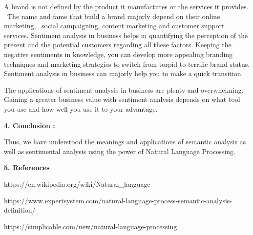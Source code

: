 \documentclass{article} %
\begin{document}
\noindent          A brand is not defined by the product it manufactures or the services it provides. ~The name and fame that build a brand majorly depend on their online marketing, ~social campaigning, content marketing and customer support services. Sentiment analysis in business helps in quantifying the perception of the present and the potential customers regarding all these factors. Keeping the negative sentiments in knowledge, you can develop more appealing branding techniques and marketing strategies to switch from torpid to terrific brand status. Sentiment analysis in business can majorly help you to make a quick transition.

\noindent           The applications of sentiment analysis in business are plenty and overwhelming. Gaining a greater business value with sentiment analysis depends on what tool you use and how well you use it to your advantage.

\noindent \textbf{}

\noindent \textbf{}

\noindent \textbf{}

\noindent \textbf{}

\noindent \textbf{}

\noindent \textbf{}

\noindent \textbf{}

\noindent \textbf{}

\noindent \textbf{}

\noindent \textbf{}

\noindent \textbf{}

\noindent \textbf{}

\noindent \textbf{}

\noindent \textbf{\eject }

\noindent \textbf{4.  Conclusion : }

\textbf{ }Thus, we have understood the meanings and applications of semantic analysis as well as sentimental analysis using the power of Natural Language Processing.

\noindent \textbf{}

\noindent \textbf{\eject }

\noindent \textbf{5.  References}

\noindent [1.] https://en.wikipedia.org/wiki/Natural\_language

\noindent [2.] https://www.expertsystem.com/natural-language-process-semantic-analysis-definition/

\noindent [3.] https://simplicable.com/new/natural-language-processing
\end{document}
